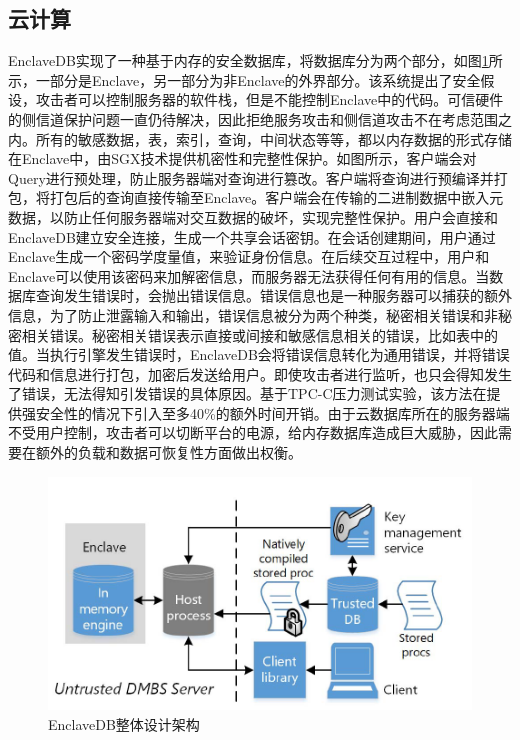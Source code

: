 \documentclass[twocolumn]{source/Paper}
\begin{document}
        \subsection{云计算}
        EnclaveDB\cite{priebe2018enclavedb}实现了一种基于内存的安全数据库，将数据库分为两个部分，如图\ref{enclavedb}所示，一部分是Enclave，另一部分为非Enclave的外界部分。该系统提出了安全假设，攻击者可以控制服务器的软件栈，但是不能控制Enclave中的代码。可信硬件的侧信道保护问题一直仍待解决，因此拒绝服务攻击和侧信道攻击不在考虑范围之内。所有的敏感数据，表，索引，查询，中间状态等等，都以内存数据的形式存储在Enclave中，由SGX技术提供机密性和完整性保护。如图所示，客户端会对Query进行预处理，防止服务器端对查询进行篡改。客户端将查询进行预编译并打包，将打包后的查询直接传输至Enclave。客户端会在传输的二进制数据中嵌入元数据，以防止任何服务器端对交互数据的破坏，实现完整性保护。用户会直接和EnclaveDB建立安全连接，生成一个共享会话密钥。在会话创建期间，用户通过Enclave生成一个密码学度量值，来验证身份信息。在后续交互过程中，用户和Enclave可以使用该密码来加解密信息，而服务器无法获得任何有用的信息。当数据库查询发生错误时，会抛出错误信息。错误信息也是一种服务器可以捕获的额外信息，为了防止泄露输入和输出，错误信息被分为两个种类，秘密相关错误和非秘密相关错误。秘密相关错误表示直接或间接和敏感信息相关的错误，比如表中的值。当执行引擎发生错误时，EnclaveDB会将错误信息转化为通用错误，并将错误代码和信息进行打包，加密后发送给用户。即使攻击者进行监听，也只会得知发生了错误，无法得知引发错误的具体原因。基于TPC-C压力测试实验，该方法在提供强安全性的情况下引入至多40\%的额外时间开销。由于云数据库所在的服务器端不受用户控制，攻击者可以切断平台的电源，给内存数据库造成巨大威胁，因此需要在额外的负载和数据可恢复性方面做出权衡。
        \begin{figure}[H]
            \centering
            \includegraphics[width=0.7\linewidth]{pic/enclavedb.png}
            \caption{EnclaveDB整体设计架构}
            \label{enclavedb}
        \end{figure}
        
        
\end{document}
